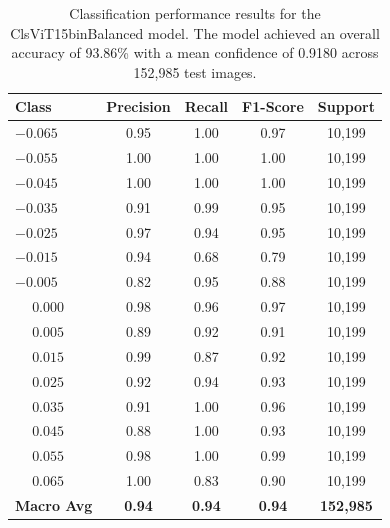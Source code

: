 \begin{table}[htbp]
\centering
\begin{tabular}{@{}lcccc@{}}
\toprule
\textbf{Class} & \textbf{Precision} & \textbf{Recall} & \textbf{F1-Score} & \textbf{Support} \\
\midrule
$-0.065$ & 0.95 & 1.00 & 0.97 & 10,199 \\
$-0.055$ & 1.00 & 1.00 & 1.00 & 10,199 \\
$-0.045$ & 1.00 & 1.00 & 1.00 & 10,199 \\
$-0.035$ & 0.91 & 0.99 & 0.95 & 10,199 \\
$-0.025$ & 0.97 & 0.94 & 0.95 & 10,199 \\
$-0.015$ & 0.94 & 0.68 & 0.79 & 10,199 \\
$-0.005$ & 0.82 & 0.95 & 0.88 & 10,199 \\
$\phantom{-}0.000$ & 0.98 & 0.96 & 0.97 & 10,199 \\
$\phantom{-}0.005$ & 0.89 & 0.92 & 0.91 & 10,199 \\
$\phantom{-}0.015$ & 0.99 & 0.87 & 0.92 & 10,199 \\
$\phantom{-}0.025$ & 0.92 & 0.94 & 0.93 & 10,199 \\
$\phantom{-}0.035$ & 0.91 & 1.00 & 0.96 & 10,199 \\
$\phantom{-}0.045$ & 0.88 & 1.00 & 0.93 & 10,199 \\
$\phantom{-}0.055$ & 0.98 & 1.00 & 0.99 & 10,199 \\
$\phantom{-}0.065$ & 1.00 & 0.83 & 0.90 & 10,199 \\
\midrule
\textbf{Macro Avg} & \textbf{0.94} & \textbf{0.94} & \textbf{0.94} & \textbf{152,985} \\
\bottomrule
\end{tabular}
\caption{Classification performance results for the ClsViT15binBalanced model. The model achieved an overall accuracy of 93.86\% with a mean confidence of 0.9180 across 152,985 test images.}
\label{tab:clf_report_ClsViT15binBalanced}
\end{table}

